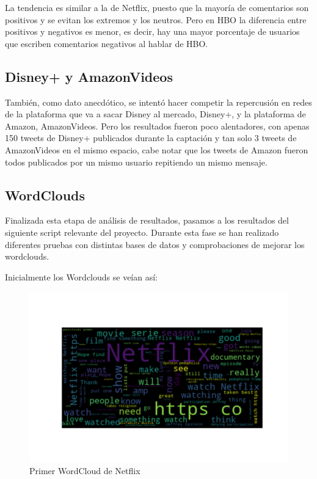 La tendencia es similar a la de Netflix, puesto que la mayoría de comentarios son positivos y se evitan los extremos y los neutros. Pero en HBO la diferencia entre positivos y negativos es menor, es decir, hay una mayor porcentaje de usuarios que escriben comentarios negativos al hablar de HBO. 



\subsection{Disney+ y AmazonVideos}

También, como dato anecdótico, se intentó hacer competir la repercusión en redes de la plataforma que va a sacar Disney al mercado, Disney+, y la plataforma de Amazon, AmazonVideos. Pero los resultados fueron poco alentadores, con apenas 150 tweets de Disney+ publicados durante la captación y tan solo 3 tweets de AmazonVideos en el mismo espacio, cabe notar que los tweets de Amazon fueron todos publicados por un mismo usuario repitiendo un mismo mensaje. 



\subsection{WordClouds}

Finalizada esta etapa de análisis de resultados, pasamos a los resultados del siguiente script relevante del proyecto. Durante esta fase se han realizado diferentes pruebas con distintas bases de datos y comprobaciones de mejorar los wordclouds. 

Inicialmente los Wordclouds se veían así: 

\begin{figure}[H]
	\centering
	\includegraphics[scale=.5]{imagenes/WordCloudNetflix1.png}
	\caption{Primer WordCloud de Netflix}
	\label{fig:wordcloudNetflix1}
\end{figure} 

